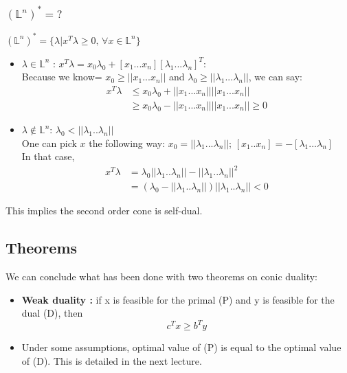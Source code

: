 \documentclass[11pt,a4paper]{article}
\begin{document}
\subsubsection*{$(\mathbb{L}^n)^*=?$}
$(\mathbb{L}^n)^*=\{\lambda | x^T \lambda \geq 0\textrm{, } \forall x \in \mathbb{L}^n \}$
\begin{itemize}
\item $\lambda \in \mathbb{L}^n$ : $x^T\lambda = x_0\lambda_0 + [x_1 ... x_n][\lambda_1 ... \lambda_n]^T$:\\
Because we know= $x_0\geq ||x_1...x_n||$ and $\lambda_0 \geq ||\lambda_1...\lambda_n||$, we can say: \begin{align*}
x^T\lambda &\leq x_0\lambda_0+||x_1...x_n||||x_1...x_n||\\
&\geq x_0\lambda_0-||x_1...x_n||||x_1...x_n|| \geq 0
\end{align*}
\item $\lambda \notin \mathbb{L}^n$: $\lambda_0 < ||\lambda_1 ..  \lambda_n||$ \\
One can pick $x$ the following way: $x_0 = ||\lambda_1...\lambda_n||$; $[x_1..x_n] = -[\lambda_1 ... \lambda_n]$\\
In that case, \begin{align*}
x^T\lambda &= \lambda_0||\lambda_1 ..  \lambda_n|| - ||\lambda_1 ..  \lambda_n||^2\\
&= (\lambda_0 - ||\lambda_1 ..  \lambda_n||)||\lambda_1 ..  \lambda_n||<0
\end{align*}
\end{itemize}
This implies the second order cone is self-dual.
\subsection*{Theorems}
We can conclude what has been done with two theorems on conic duality:

\begin{itemize}
\item \textbf{Weak duality :} if x is feasible for the primal (P) and y is feasible for the dual (D), then $$c^Tx\ge b^Ty$$
\item Under some assumptions, optimal value of (P) is equal to the optimal value of (D). This is detailed in the next lecture.
\end{itemize}
\end{document}
